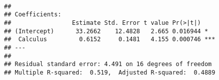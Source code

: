 \documentclass{article}\usepackage[]{graphicx}\usepackage[]{color}
\makeatletter
\newenvironment{kframe}{%
 \def\at@end@of@kframe{}%
 \ifinner\ifhmode%
  \def\at@end@of@kframe{\end{minipage}}%
  \begin{minipage}{\columnwidth}%
 \fi\fi%
 \def\FrameCommand##1{\hskip\@totalleftmargin \hskip-\fboxsep
 \colorbox{shadecolor}{##1}\hskip-\fboxsep
     \hskip-\linewidth \hskip-\@totalleftmargin \hskip\columnwidth}%
 \MakeFramed {\advance\hsize-\width
   \@totalleftmargin\z@ \linewidth\hsize
   \@setminipage}}%
 {\par\unskip\endMakeFramed%
 \at@end@of@kframe}
\newenvironment{knitrout}{}{} %
\makeatother
\begin{document}
\begin{knitrout}
\color{fgcolor}\begin{kframe}
\begin{verbatim}

## 
## Coefficients:
##                 Estimate Std. Error t value Pr(>|t|)    
## (Intercept)      33.2662    12.4828   2.665 0.016944 *  
##  Calculus         0.6152     0.1481   4.155 0.000746 ***
## ---
## 
## Residual standard error: 4.491 on 16 degrees of freedom
## Multiple R-squared:  0.519,	Adjusted R-squared:  0.4889 

\end{verbatim}
\end{kframe}
\end{knitrout}
\end{document}
